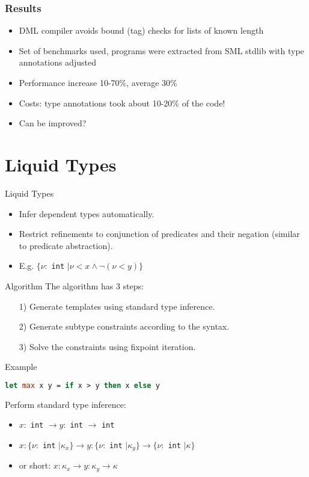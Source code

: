 \documentclass[pdf]{beamer}
\begin{document}
\begin{frame}
  \frametitle{Results}

  \begin{itemize}
    \item DML compiler avoids bound (tag) checks for lists of known length
    \item Set of benchmarks used, programs were extracted from SML stdlib with
      type annotations adjusted
    \item Performance increase 10-70\%, average 30\%
    \item Costs: type annotations took about 10-20\% of the code!
    \item Can be improved?
  \end{itemize}
\end{frame}

\section{Liquid Types}
\begin{frame}{Liquid Types}
  \begin{itemize}
    \item Infer dependent types automatically.
    \item Restrict refinements to conjunction of predicates and their negation (similar to predicate abstraction).
    \item E.g. $\{\nu:$ \lstinline{int} $\mid \nu < x \land \neg(\nu < y)\}$
  \end{itemize}
\end{frame}

\begin{frame}{Algorithm}
  The algorithm has 3 steps:
  \begin{itemize}
    \item[1)] Generate templates using standard type inference.
    \item[2)] Generate subtype constraints according to the syntax.
    \item[3)] Solve the constraints using fixpoint iteration.
  \end{itemize}
\end{frame}

\begin{frame}[fragile]{Example}
  \begin{lstlisting}[language=ML]
let max x y = if x > y then x else y
  \end{lstlisting}
  Perform standard type inference:
  \begin{itemize}
    \item $x:$ \lstinline{int} $\rightarrow y:$ \lstinline{int} $\rightarrow$ \lstinline{int}
    \item $x: \{\nu:$ \lstinline{int} $\mid \kappa_x\} \rightarrow y: \{\nu:$ \lstinline{int} $\mid \kappa_y\} \rightarrow \{\nu:$ \lstinline{int} $\mid \kappa\}$
    \item or short: $x: \kappa_x \rightarrow y: \kappa_y \rightarrow \kappa$
  \end{itemize}
\end{frame}
\end{document}
